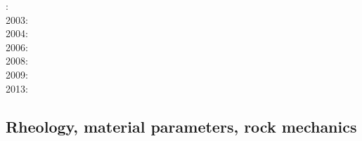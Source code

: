 {\scriptsize
{}: \cite{reyu00}\\
2003: \cite{reyu03}\\
2004: \cite{reyu04}\\
2006: \cite{rehy06}\cite{rewr06}\\
2008: \cite{rerw08}\\
2009: \cite{reps09}\\
2013: \cite{revp13}
}

\subsection{Rheology, material parameters, rock mechanics}


